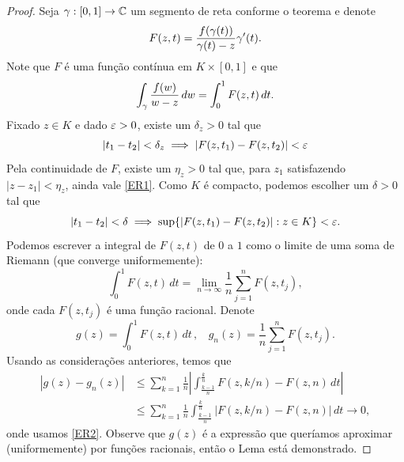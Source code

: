     \begin{proof}
        Seja $\gamma : [0,1] \to \mathbb{C}$ um segmento de reta conforme o teorema e denote
        \begin{equation*}
            F(z,t) = \frac{f(\gamma(t))}{\gamma(t) - z}\gamma'(t).
        \end{equation*}
        Note que $F$ é uma função contínua em $K \times [0,1]$ e que
        \begin{equation*}
            \int_\gamma \frac{f(w)}{w-z}\,dw = \int_{0}^{1}F(z,t)\,dt.
        \end{equation*}
        Fixado $z \in K$ e dado $\varepsilon > 0$, existe um $\delta_z > 0$ tal que
        \begin{equation}
        \label{ER1}
            |t_1 - t_2| < \delta_z \implies |F(z,t_1) - F(z,t_2)| < \varepsilon
        \end{equation}
        Pela continuidade de $F$, existe um $\eta_z > 0$ tal que, para $z_1$ satisfazendo 
        $|z-z_1| < \eta_z$, ainda vale \eqref{ER1}. Como $K$ é compacto, podemos escolher 
        um $\delta > 0$ tal que
        \begin{equation}
        \label{ER2}
            |t_1 - t_2| < \delta \implies \sup \{|F(z,t_1) - F(z,t_2)| : z \in K\} < \varepsilon.   
        \end{equation}
        Podemos escrever a integral de $F(z,t)$ de $0$ a $1$ como o limite de uma soma de Riemann 
        (que converge uniformemente):
        \begin{equation*}
            \int_{0}^{1}F(z,t) \, dt = \lim_{n \to \infty}\frac{1}{n}\sum_{j=1}^{n}F(z,t_j),
        \end{equation*}
        onde cada $F(z,t_j)$ é uma função racional. Denote
        \begin{equation*}
            g(z) = \int_{0}^{1}F(z,t) \, dt \, ,  \ \ \ \ g_n(z) = \frac{1}{n}\sum_{j=1}^{n}F(z,t_j).
        \end{equation*}
        Usando as considerações anteriores, temos que 
        \begin{align*}
            |g(z) - g_n(z)| 
            &\leq 
            \sum_{k=1}^{n}\frac{1}{n}\left|\int_{\frac{k-1}{n}}^{\frac{k}{n}}F(z,k/n) - F(z,n) \, dt \right| \\
            &\leq \sum_{k=1}^{n}\frac{1}{n}\int_{\frac{k-1}{n}}^{\frac{k}{n}}|F(z,k/n) - F(z,n)| \, dt
            \to 0,
        \end{align*}
        onde usamos \eqref{ER2}. Observe que $g(z)$ é a expressão que queríamos aproximar
        (uniformemente) por funções racionais, então o Lema está demonstrado.
    \end{proof}
    \\ \\
    
